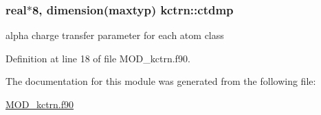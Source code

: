 \hypertarget{classkctrn_ae00b8e138190b3b5418f5b4bb46a664c}{
\subsubsection[{ctdmp}]{\setlength{\rightskip}{0pt plus 5cm}real$\ast$8, dimension(maxtyp) kctrn\-::ctdmp}}\label{classkctrn_ae00b8e138190b3b5418f5b4bb46a664c}


alpha charge transfer parameter for each atom class 



Definition at line 18 of file M\-O\-D\-\_\-kctrn.\-f90.



The documentation for this module was generated from the following file\-:\begin{DoxyCompactItemize}
\item 
\hyperlink{MOD__kctrn_8f90}{M\-O\-D\-\_\-kctrn.\-f90}\end{DoxyCompactItemize}
